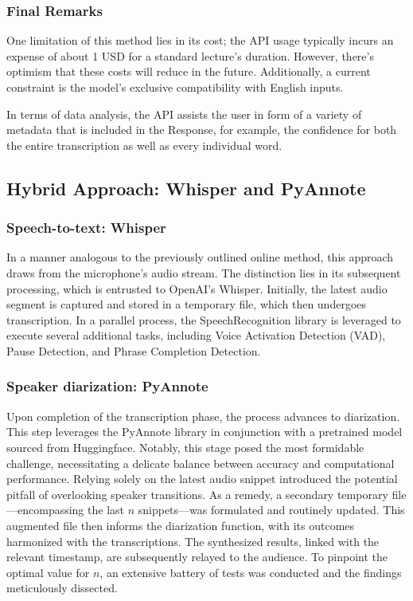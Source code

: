 \documentclass[12pt]{article}
\begin{document}
\subsubsection{Final Remarks}

One limitation of this method lies in its cost; the API usage typically incurs an expense of about 1 USD for a standard lecture's duration. However, there's optimism that these costs will reduce in the future. Additionally, a current constraint is the model's exclusive compatibility with English inputs.

In terms of data analysis, the API assists the user in form of a variety of metadata that is included in the Response, for example, the confidence for both the entire transcription as well as every individual word.

\subsection{Hybrid Approach: Whisper and PyAnnote}
\label{ssec:offline}

\subsubsection{Speech-to-text: Whisper}

In a manner analogous to the previously outlined online method, this approach draws from the microphone's audio stream. The distinction lies in its subsequent processing, which is entrusted to OpenAI's Whisper. Initially, the latest audio segment is captured and stored in a temporary file, which then undergoes transcription. In a parallel process, the SpeechRecognition library is leveraged to execute several additional tasks, including Voice Activation Detection (VAD), Pause Detection, and Phrase Completion Detection.

\subsubsection{Speaker diarization: PyAnnote}

Upon completion of the transcription phase, the process advances to diarization. This step leverages the PyAnnote library in conjunction with a pretrained model sourced from Huggingface. Notably, this stage posed the most formidable challenge, necessitating a delicate balance between accuracy and computational performance. Relying solely on the latest audio snippet introduced the potential pitfall of overlooking speaker transitions. As a remedy, a secondary temporary file—encompassing the last $n$ snippets—was formulated and routinely updated. This augmented file then informs the diarization function, with its outcomes harmonized with the transcriptions. The synthesized results, linked with the relevant timestamp, are subsequently relayed to the audience. To pinpoint the optimal value for $n$, an extensive battery of tests was conducted and the findings meticulously dissected.
\end{document}
